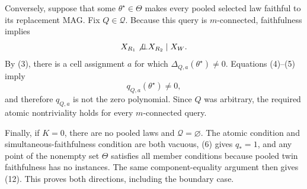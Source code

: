 Conversely, suppose that some \(\theta^\star\in\Theta\) makes every pooled selected law faithful to its replacement MAG.  Fix \(Q\in\mathcal Q\).  Because this query is \(m\)-connected, faithfulness implies
\[
 X_{R_1}\not\!\mathbin{\perp\!\!\!\perp}X_{R_2}\mid X_W.
\]
By (3), there is a cell assignment \(a\) for which \(\Delta_{Q,a}(\theta^\star)\ne0\).  Equations (4)--(5) imply
\[
 q_{Q,a}(\theta^\star)\ne0,
 \tag{13}
\]
and therefore \(q_{Q,a}\) is not the zero polynomial.  Since \(Q\) was arbitrary, the required atomic nontriviality holds for every \(m\)-connected query.

Finally, if \(K=0\), there are no pooled laws and \(\mathcal Q=\varnothing\).  The atomic condition and simultaneous-faithfulness condition are both vacuous, (6) gives \(q_*=1\), and any point of the nonempty set \(\Theta\) satisfies all member conditions because pooled twin faithfulness has no instances.  The same component-equality argument then gives (12).  This proves both directions, including the boundary case.
